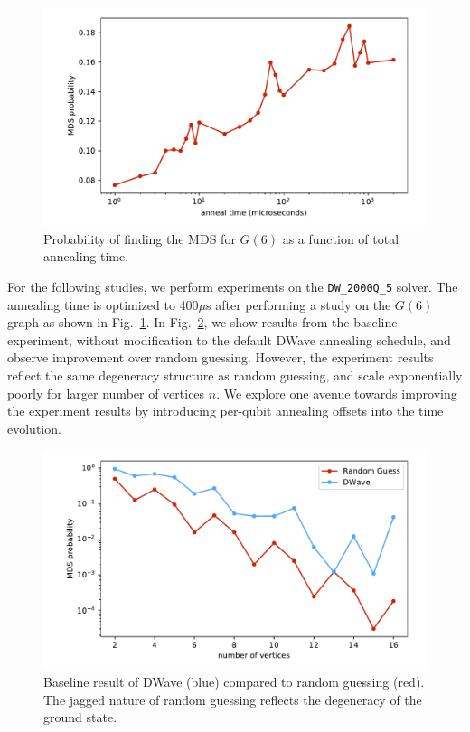 \documentclass[prd,twocolumn,tightenlines,preprintnumbers,showpacs,superscriptaddress,notitlepage,nofootinbib,eqsecnum,floatfix,longbibliography]{revtex4}
\begin{document}
\begin{figure}[b]
	\centering
	\includegraphics[width=\columnwidth]{./figures/anneal_time_scaling.pdf}
	\caption{Probability of finding the MDS for $G(6)$ as a function of total annealing time.}
	\label{fig:at_scale}
\end{figure}

For the following studies, we perform experiments on the \texttt{DW\_2000Q\_5} solver. The annealing time is optimized to 400$\mu$s after performing a study on the $G(6)$ graph as shown in Fig.~\ref{fig:at_scale}. In Fig.~\ref{fig:baseline}, we show results from the baseline experiment, without modification to the default DWave annealing schedule, and observe improvement over random guessing. However, the experiment results reflect the same degeneracy structure as random guessing, and scale exponentially poorly for larger number of vertices $n$. We explore one avenue towards improving the experiment results by introducing per-qubit annealing offsets into the time evolution.

\begin{figure}
	\centering
	\includegraphics[width=\columnwidth]{./figures/scaling_baseline.pdf}
	\caption{Baseline result of DWave (blue) compared to random guessing (red). The jagged nature of random guessing reflects the degeneracy of the ground state.}
	\label{fig:baseline}
\end{figure}
\end{document}
